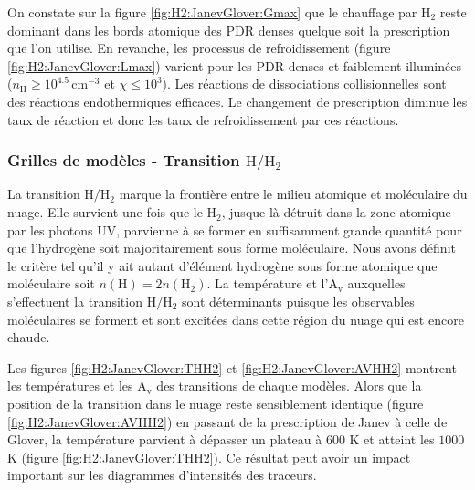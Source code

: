 On constate sur la figure \ref{fig:H2:JanevGlover:Gmax} que le chauffage par $\mathrm{H}_2$ reste dominant dans les bords atomique des PDR denses quelque soit la prescription que l'on utilise. En revanche, les processus de refroidissement (figure \ref{fig:H2:JanevGlover:Lmax}) varient pour les PDR denses et faiblement illuminées ($n_\mathrm{H} \geq 10^{4.5} \, \mathrm{cm}^{-3}$ et $\chi \leq 10^3$). Les réactions de dissociations collisionnelles sont des réactions endothermiques efficaces. Le changement de prescription diminue les taux de réaction et donc les taux de refroidissement par ces réactions. 


\subsubsection{Grilles de modèles - Transition $\mathrm{H}/\mathrm{H}_2$}

La transition $\mathrm{H}/\mathrm{H}_2$ marque la frontière entre le milieu atomique et moléculaire du nuage. Elle survient une fois que le $\mathrm{H}_2$, jusque là détruit dans la zone atomique par les photons UV, parvienne à se former en suffisamment grande quantité pour que l'hydrogène soit majoritairement sous forme moléculaire. Nous avons définit le critère tel qu'il y ait autant d'élément hydrogène sous forme atomique que moléculaire soit $n(\mathrm{H}) = 2 n(\mathrm{H}_2)$. La température et l'$\mathrm{A}_\mathrm{v}$ auxquelles s'effectuent la transition $\mathrm{H}/\mathrm{H}_2$ sont déterminants puisque les observables moléculaires se forment et sont excitées dans cette région du nuage qui est encore chaude. \newline

Les figures \ref{fig:H2:JanevGlover:THH2} et \ref{fig:H2:JanevGlover:AVHH2} montrent les températures et les $\mathrm{A}_\mathrm{v}$ des transitions de chaque modèles. Alors que la position de la transition dans le nuage reste sensiblement identique (figure \ref{fig:H2:JanevGlover:AVHH2}) en passant de la prescription de Janev à celle de Glover, la température parvient à dépasser un plateau à $600$ K et atteint les $1000$ K (figure \ref{fig:H2:JanevGlover:THH2}). Ce résultat peut avoir un impact important sur les diagrammes d'intensités des traceurs. 


